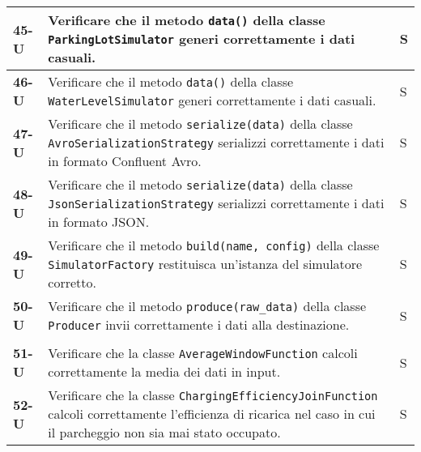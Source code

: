 \begin{longtable}{|>{\raggedright\arraybackslash}m{}|>{\raggedright\arraybackslash}m{}|>{\raggedright\arraybackslash}m{}|}
	\hline
	\textbf{45-U}   & Verificare che il metodo \texttt{data()} della classe \texttt{ParkingLotSimulator} generi correttamente i dati casuali.                                                                                                                          & S              \\
	\hline
	\textbf{46-U}   & Verificare che il metodo \texttt{data()} della classe \texttt{WaterLevelSimulator} generi correttamente i dati casuali.                                                                                                                          & S              \\
	\hline
	\textbf{47-U}   & Verificare che il metodo \texttt{serialize(data)} della classe \texttt{AvroSerializationStrategy} serializzi correttamente i dati in formato Confluent Avro.                                                                                     & S              \\
	\hline
	\textbf{48-U}   & Verificare che il metodo \texttt{serialize(data)} della classe \texttt{JsonSerializationStrategy} serializzi correttamente i dati in formato JSON.                                                                                               & S              \\
	\hline
	\textbf{49-U}   & Verificare che il metodo \texttt{build(name, config)} della classe \texttt{SimulatorFactory} restituisca un'istanza del simulatore corretto.                                                                                                     & S              \\
	\hline
	\textbf{50-U}   & Verificare che il metodo \texttt{produce(raw\_data)} della classe \texttt{Producer} invii correttamente i dati alla destinazione.                                                                                                                & S              \\
	\hline
	\multicolumn{3}{|c|}{\textbf{Apache Flink}} \\
	\hline
	\textbf{51-U}   & Verificare che la classe \texttt{AverageWindowFunction} calcoli correttamente la media dei dati in input.                                                                                                                                        & S              \\
	\hline
	\textbf{52-U}   & Verificare che la classe \texttt{ChargingEfficiencyJoinFunction} calcoli correttamente l'efficienza di ricarica nel caso in cui il parcheggio non sia mai stato occupato.                                                                        & S              \\

\end{longtable}
